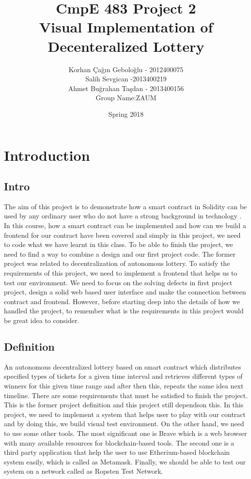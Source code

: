\documentclass[]{scrreprt}
\title{CmpE 483 Project 2 \\Visual Implementation of Decenteralized Lottery 
	 }
\author{Korhan \c{C}a\u{g}{\i}n Gebolo\u{g}lu - 2012400075\\Salih Sevgican -2013400219 \\Ahmet Bu\u{g}rahan Ta\c{s}dan - 2013400156\\ Group Name:ZAUM}
\date{Spring 2018}
\begin{document}
\maketitle
\cleardoublepage
{} 
\cleardoublepage
\renewcommand\thepage{\romannumeral\numexpr\value{page}-1\relax}

\tableofcontents
\cleardoublepage
{}
\chapter{Introduction}
\section{Intro}
The aim of this project is to demonstrate how a smart contract in Solidity\cite{Solidity} can be used by any ordinary user who do not have a strong background in technology . In this course, how a smart contract can be implemented and how can we build a frontend for our contract have been covered and simply in this project, we need to code what we have learnt in this class. To be able to finish the project, we need to find a way to combine a design and our first project code. The former project was related to decentralization of autonomous lottery. To satisfy the requirements of this project, we need to implement a frontend that helps us to test our environment. We need to focus on the solving defects in first project project, design a solid web based user interface and make the connection between contract and frontend. However, before starting deep into the details of how we handled the project, to remember what is the requirements in this project would be great idea to consider. \\ 
\section{Definition}
An autonomous decentralized lottery based on smart contract which distributes specified types of tickets for a given time interval and retrieves different types of winners for this given time range and after then this, repeats the same idea next timeline. There are some requirements that must be satisfied to finish the project. This is the former project definition and this project still dependson this. In this project, we need to implement a system that helps user to play with our contract and by doing this, we build visual test environment. On the other hand, we need to use some other tools. The most significant one is Brave\cite{Brave} which is a web browser with many available resources for blockchain-based tools. The second one is a third party application that help the user to use Etherium-based blockchain system easily, which is called as Metamask\cite{Metamask}. Finally, we should be able to test our system on a network called as Ropsten Test Network\cite{Ropsten}. 
\end{document}
